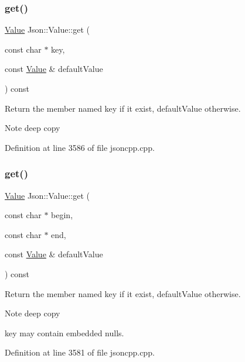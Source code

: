 \subsubsection{\texorpdfstring{get()}{get()}\hspace{0.1cm}{\footnotesize\ttfamily [6/8]}}
{\footnotesize\ttfamily \hyperlink{class_json_1_1_value}{Value} Json\+::\+Value\+::get (\begin{DoxyParamCaption}\item[{const char $\ast$}]{key,  }\item[{const \hyperlink{class_json_1_1_value}{Value} \&}]{default\+Value }\end{DoxyParamCaption}) const}

Return the member named key if it exist, default\+Value otherwise. \begin{DoxyNote}{Note}
deep copy 
\end{DoxyNote}


Definition at line 3586 of file jsoncpp.\+cpp.

\hypertarget{class_json_1_1_value_aa59ed050e87e1d58d93671a38687f36c}{}\label{class_json_1_1_value_aa59ed050e87e1d58d93671a38687f36c} 
\subsubsection{\texorpdfstring{get()}{get()}\hspace{0.1cm}{\footnotesize\ttfamily [7/8]}}
{\footnotesize\ttfamily \hyperlink{class_json_1_1_value}{Value} Json\+::\+Value\+::get (\begin{DoxyParamCaption}\item[{const char $\ast$}]{begin,  }\item[{const char $\ast$}]{end,  }\item[{const \hyperlink{class_json_1_1_value}{Value} \&}]{default\+Value }\end{DoxyParamCaption}) const}

Return the member named key if it exist, default\+Value otherwise. \begin{DoxyNote}{Note}
deep copy 

key may contain embedded nulls. 
\end{DoxyNote}


Definition at line 3581 of file jsoncpp.\+cpp.

\hypertarget{class_json_1_1_value_a7406e6af727c288bf8ab59945ece686a}{}\label{class_json_1_1_value_a7406e6af727c288bf8ab59945ece686a} 
